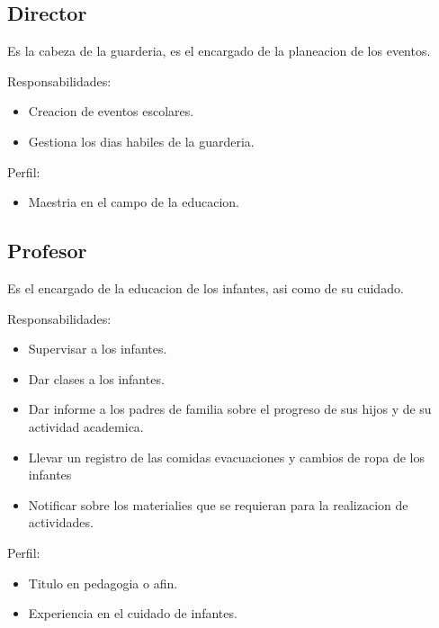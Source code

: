 \begin{Usuario}{\hypertarget{director}{\subsection{Director}}}{
	Es la cabeza de la guarderia, es el encargado de la planeacion de los eventos.
}
    \item[Responsabilidades:] \cdtEmpty
    \begin{itemize}
		\item Creacion de eventos escolares.
		\item Gestiona los dias habiles de la guarderia.
    \end{itemize}

	\item[Perfil:] \cdtEmpty
    \begin{itemize}
		\item Maestria en el campo de la educacion.
    \end{itemize}
\end{Usuario}

\begin{Usuario}{\hypertarget{docente}{\subsection{Profesor}}}{
	Es el encargado de la educacion de los infantes, asi como de su cuidado.
}
    \item[Responsabilidades:] \cdtEmpty
    \begin{itemize}
		\item Supervisar a los infantes.
		\item Dar clases a los infantes.
		\item Dar informe a los padres de familia sobre el progreso de sus hijos y de su                  actividad academica.
            \item Llevar un registro de las comidas evacuaciones y cambios de ropa de los infantes
            \item Notificar sobre los materialies que se requieran para la realizacion de actividades.
    \end{itemize}

	\item[Perfil:] \cdtEmpty
    \begin{itemize}
		\item Titulo en pedagogia o afin.
		\item Experiencia en el cuidado de infantes.
    \end{itemize}
\end{Usuario}

